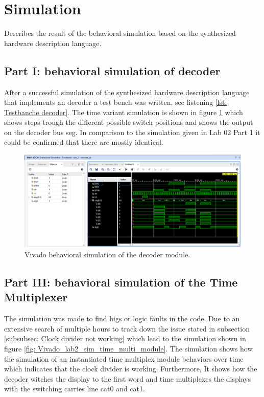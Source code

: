 \section{Simulation} \label{sec: Simulation}
Describes the result of the behavioral simulation based on the synthesized hardware description language.

\subsection{Part I: behavioral simulation of decoder} \label{subsec: Part I: behavioral simulation of decoder}
After a successful simulation of the synthesized hardware description language that implements an decoder a test bench was written, see listening \ref{lst: Testbanche decoder}. The time variant simulation is shown in figure \ref{fig: Vivado_lab1_BS} which shows steps trough the different possible switch positions and shows the output on the decoder bus seg. In comparison to the simulation given in Lab 02 Part 1 it could be confirmed that there are mostly identical.

\begin{figure}[H]
	\centering
	\includegraphics[width=1.0\textwidth ]{01_images/Vivado_lab2_BS.PNG}
	\caption{Vivado behavioral simulation of the decoder module.}
	\label{fig: Vivado_lab1_BS}
\end{figure}

\subsection{Part III: behavioral simulation of the Time Multiplexer} \label{Part III: behavioral simulation of the Time Multiplexer}
The simulation was made to find bigs or logic faults in the code. Due to an extensive search of multiple hours to track down the issue stated in subsection \ref{subsubsec: Clock divider not working} which lead to the simulation shown in figure \ref{fig: Vivado_lab2_sim_time_multi_module}. The simulation shows how the simulation of an instantiated time multiplex module behaviors over time which indicates that the clock divider is working. Furthermore, It shows how the decoder witches the display to the first word and time multiplexes the displays with the switching carries line cat0 and cat1. 

